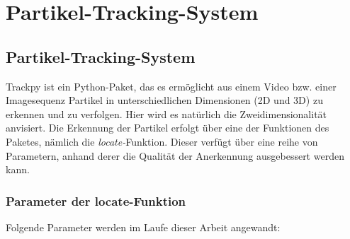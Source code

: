 \chapter{Partikel-Tracking-System \label{kap3}}

\section{Partikel-Tracking-System}
Trackpy ist ein Python-Paket, das es ermöglicht aus einem Video bzw. einer Imagesequenz Partikel in unterschiedlichen Dimensionen (2D und 3D) zu erkennen und zu verfolgen. Hier wird es natürlich die Zweidimensionalität anvisiert. Die Erkennung der Partikel erfolgt über eine der Funktionen des Paketes, nämlich die \textit{locate-}Funktion.
Dieser verfügt über eine reihe von Parametern, anhand derer die Qualität der Anerkennung ausgebessert werden kann.

	\subsection{Parameter der locate-Funktion \label{kap3_param_loacate}}
		Folgende Parameter werden im Laufe dieser Arbeit angewandt:

